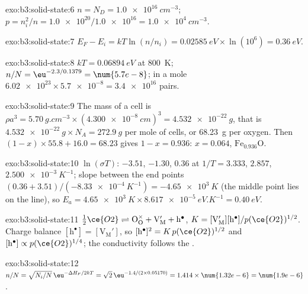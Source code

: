 \begin{solution}{exo:b3:solid-state:6}
$n = N_D = \qty{1.0e16}{cm^{-3}}$; $p = n_i^2/n = \num{1.0e20}/\num{1.0e16} = \qty{1.0e4}{cm^{-3}}$.
\end{solution}

\begin{solution}{exo:b3:solid-state:7}
$E_F - E_i = kT\ln(n/n_i) = \qty{0.02585}{eV} \times \ln(10^6) = \qty{0.36}{eV}$.
\end{solution}

\begin{solution}{exo:b3:solid-state:8}
$kT = \qty{0.06894}{eV}$ at \qty{800}{K}; $n/N = \eu^{-2.3/0.1379} = \num{5.7e-8}$; in a mole $\num{6.02e23} \times \num{5.7e-8} = \num{3.4e16}$
pairs.
\end{solution}

\begin{solution}{exo:b3:solid-state:9}
The mass of a cell is $\rho a^3 = \qty{5.70}{g.cm^{-3}} \times (\qty{4.300e-8}{cm})^3 = \qty{4.532e-22}{g}$, that is
$\qty{4.532e-22}{g} \times N_A = \qty{272.9}{g}$ per mole of cells, or \qty{68.23}{g} per oxygen. Then
$(1 - x) \times 55.8 + 16.0 = 68.23$ gives $1 - x = 0.936$: $x = 0.064$, $\mathrm{Fe_{0.936}O}$.
\end{solution}

\begin{solution}{exo:b3:solid-state:10}
$\ln(\sigma T)$: $-3.51$, $-1.30$, $0.36$ at $1/T = 3.333$, $2.857$, $\qty{2.500e-3}{K^{-1}}$; slope between the end points
$(0.36 + 3.51)/(-\qty{8.33e-4}{K^{-1}}) = -\qty{4.65e3}{K}$ (the middle point lies on the line), so
$E_a = \qty{4.65e3}{K} \times \qty{8.617e-5}{eV.K^{-1}} = \qty{0.40}{eV}$.
\end{solution}

\begin{solution}{exo:b3:solid-state:11}
$\tfrac12\ce{O2} \rightleftharpoons \mathrm{O_O^{\times} + V_M' + h^{\bullet}}$, $K = [\mathrm{V_M'}][\mathrm h^\bullet]/p(\ce{O2})^{1/2}$. Charge balance $[\mathrm h^\bullet] = [\mathrm{V_M'}]$, so
$[\mathrm h^\bullet]^2 = K\,p(\ce{O2})^{1/2}$ and $[\mathrm h^\bullet] \propto p(\ce{O2})^{1/4}$; the conductivity follows the .
\end{solution}

\begin{solution}{exo:b3:solid-state:12}
$n/N = \sqrt{N_i/N}\,\eu^{-\Delta H_F/2kT} = \sqrt 2\,\eu^{-1.4/(2 \times 0.05170)} = 1.414 \times \num{1.32e-6} = \num{1.9e-6}$.
\end{solution}

